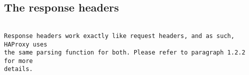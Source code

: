 
\subsection{The response headers}

\begin{verbatim}

Response headers work exactly like request headers, and as such, HAProxy uses
the same parsing function for both. Please refer to paragraph 1.2.2 for more
details.


\end{verbatim}
